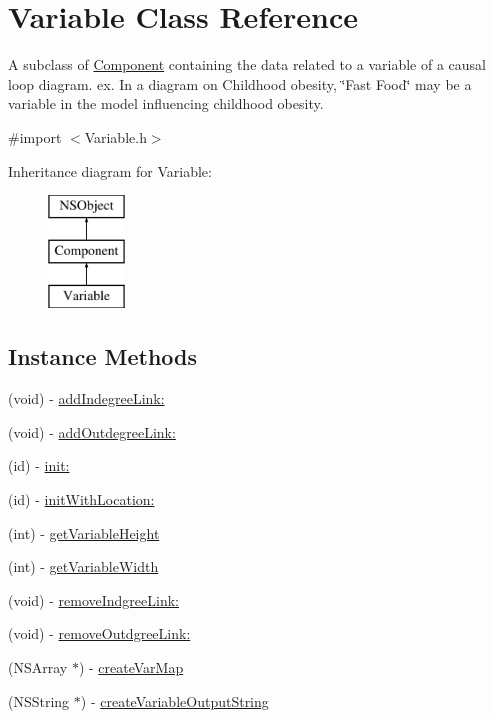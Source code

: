 \hypertarget{interface_variable}{\section{Variable Class Reference}
\label{interface_variable}
}


A subclass of \hyperlink{interface_component}{Component} containing the data related to a variable of a causal loop diagram. ex. In a diagram on Childhood obesity, \char`\"{}\-Fast Food\char`\"{} may be a variable in the model influencing childhood obesity.  




{\ttfamily \#import $<$Variable.\-h$>$}

Inheritance diagram for Variable\-:\begin{figure}[H]
\begin{center}
\leavevmode
\includegraphics[height=3.000000cm]{interface_variable}
\end{center}
\end{figure}
\subsection*{Instance Methods}
\begin{DoxyCompactItemize}
\item 
(void) -\/ \hyperlink{interface_variable_a94f7b8f580fb81fe04cbdb35e5058336}{add\-Indegree\-Link\-:}
\item 
(void) -\/ \hyperlink{interface_variable_ae0173c90b0ab12d38f7ad61696ed8e54}{add\-Outdegree\-Link\-:}
\item 
(id) -\/ \hyperlink{interface_variable_ae3fdc3a923d3d3be4b4aeb821cb90734}{init\-:}
\item 
(id) -\/ \hyperlink{interface_variable_a9755af4c66523c228c80713cab6396fe}{init\-With\-Location\-:}
\item 
(int) -\/ \hyperlink{interface_variable_a79b759708a8f8644dd6913b4ae5762e5}{get\-Variable\-Height}
\item 
(int) -\/ \hyperlink{interface_variable_a388e832a7faf40b36f9a7a6f592d58d7}{get\-Variable\-Width}
\item 
(void) -\/ \hyperlink{interface_variable_a36d0d6828a9b4691b0db41445af18317}{remove\-Indgree\-Link\-:}
\item 
(void) -\/ \hyperlink{interface_variable_a025b64b058ba0294e2ef0bf10cbc70e7}{remove\-Outdgree\-Link\-:}
\item 
(N\-S\-Array $\ast$) -\/ \hyperlink{interface_variable_a1ff5e4a4052dff234ff327980ae2f92e}{create\-Var\-Map}
\item 
(N\-S\-String $\ast$) -\/ \hyperlink{interface_variable_a4c7e0685f86eef33404c7ada436db10a}{create\-Variable\-Output\-String}
\end{DoxyCompactItemize}
